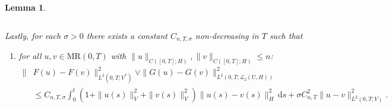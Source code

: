 \documentclass{amsart}
\newcommand{\dd}{\,\mathrm{d}}
\renewcommand{\MR}{\mathrm{MR}}
\newcommand{\UH}{\mathcal{L}_2(U,H)}
\newcommand{\<}{\langle}
\newcommand{\?}{\rangle}
\theoremstyle{plain}
\theoremstyle{remark}
\theoremstyle{plain}
\newtheorem{lemma}[theorem]{Lemma}
\numberwithin{equation}{section}
\begin{document}
\begin{lemma}
\begin{enumerate}[resume,label=\emph{(\roman*)},ref=\textup{(\roman*)}]
\begin{equation*}
  \end{equation*}
  \end{enumerate}
  Lastly, for each $\sigma>0$ there exists a constant $C_{n,T,\sigma}$ non-decreasing in $T$ such that
  \begin{enumerate}[resume,label=\emph{(\roman*)},ref=\textup{(\roman*)}]
  \item \label{it:emb5} for all $u,v\in\MR(0,T)$ with $\|u\|_{C([0,T];H)},\|v\|_{C([0,T];H)}\leq n$:
  \begin{align*}\label{eq: estimate F G difference}
  \|&F(u)-F(v)\|_{L^2(0,T;V^*)}^2\vee \|G(u)-G(v)\|_{L^2(0,T;\UH)}^2\\
  &\leq C_{n,T,\sigma}\int_0^t(1+\|u(s)\|_V^2+\|v(s)\|_V^2)\|u(s)-v(s)\|_H^2\dd s+\sigma C_{n,T}^2\|u-v\|_{L^2(0,T;V)}^2.
  \end{align*}
  \end{enumerate}
\end{lemma}
\end{document}

